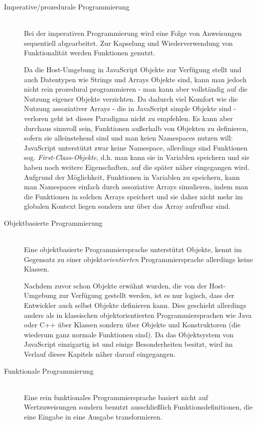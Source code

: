 \begin{description}
\item[Imperative/prozedurale Programmierung] \hfill \\
Bei der imperativen Programmierung wird eine Folge von Anweisungen sequentiell abgearbeitet. Zur
Kapselung und Wiederverwendung von Funktionalität werden Funktionen genutzt.
\citep[Kap. 1.3.1]{progsprachen}

Da die Host-Umgebung in JavaScript Objekte zur Verfügung stellt und auch Datentypen wie Strings und
Arrays Objekte sind, kann man jedoch nicht rein prozedural programmieren - man kann aber vollständig
auf die Nutzung eigener Objekte verzichten. Da dadurch viel Komfort wie die Nutzung assoziativer
Arrays - die in JavaScript simple Objekte sind - verloren geht ist dieses Paradigma nicht zu
empfehlen. Es kann aber durchaus sinnvoll sein, Funktionen außerhalb von Objekten zu definieren,
sofern sie alleinstehend sind und man keien Namespaces nutzen will: JavaScript unterstützt zwar
keine Namespace, allerdings sind Funktionen sog. \emph{First-Class-Objekte}, d.h. man kann sie in
Variablen speichern und sie haben noch weitere Eigenschaften, auf die später näher eingegangen
wird. Aufgrund der Möglichkeit, Funktionen in Variablen zu speichern, kann man Namespaces einfach
durch assoziative Arrays simulieren, indem man die Funktionen in solchen Arrays speichert und sie
daher nicht mehr im globalen Kontext liegen sondern nur über das Array aufrufbar sind.

\item[Objektbasierte Programmierung] \hfill \\
Eine objektbasierte Programmiersprache unterstützt Objekte, kennt im Gegensatz zu einer
objekt\emph{orientierten} Programmiersprache allerdings keine Klassen.
\citep[Kap. 1.3.1]{progsprachen}

Nachdem zuvor schon Objekte erwähnt wurden, die von der Host-Umgebung zur Verfügung gestellt werden,
ist es nur logisch, dass der Entwickler auch selbst Objekte definieren kann. Dies geschieht
allerdings anders als in klassischen objektorientierten Programmiersprachen wie Java oder C++ über
Klassen sondern über Objekte und Konstruktoren (die wiederum ganz normale Funktionen sind).
Da das Objektsystem von JavaScript einzigartig ist und einige Besonderheiten besitzt, wird im
Verlauf dieses Kapitels näher darauf eingegangen.

\item[Funktionale Programmierung] \hfill \\
Eine rein funktionales Programmiersprache basiert nicht auf Wertzuweisungen sondern benutzt
ausschließlich Funktionsdefinitionen, die eine Eingabe in eine Ausgabe transformieren.
\citep[Kap. 1.3.1]{progsprachen}


\end{description}
